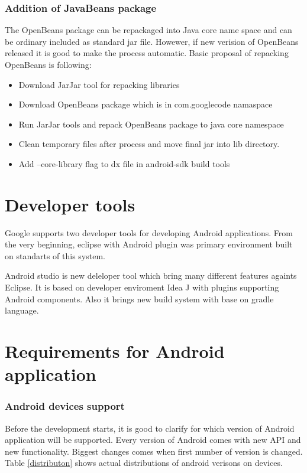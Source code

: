 \subsubsection{Addition of JavaBeans package}
The OpenBeans package can be repackaged into Java core name space and can be ordinary included as standard jar file. Howewer, if new verision of OpenBeans
released it is good to make the process automatic. Basic proposal of repacking OpenBeans is following:
\begin{itemize}
\item Download JarJar tool for repacking libraries
\item Download OpenBeans package which is in com.googlecode namaspace
\item Run JarJar tools and repack OpenBeans package to java core namespace
\item Clean temporary files after process and move final jar into lib directory.
\item Add --core-library flag to dx file in android-sdk build tools
\end{itemize}

\section{Developer tools}
Google supports two developer tools for developing Android applications. From the very beginning, eclipse with Android plugin was primary environment built
on standarts of this system.

Android studio is new deleloper tool which bring many different features againts Eclipse. It is based on developer enviroment Idea J with plugins supporting
Android components. Also it brings new build system with base on gradle language.


\section{Requirements for Android application}



\subsubsection{Android devices support}
Before the development starts, it is good to clarify for which version of Android application will be supported. Every version of Android
comes with new API and new functionality. Biggest changes comes when first number of version is changed. Table \ref{distributon} shows
actual distributions of android verisons on devices.

